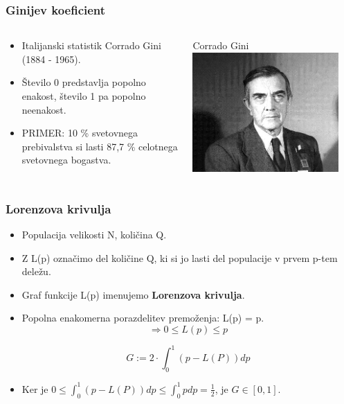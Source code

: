 \documentclass[10pt]{beamer}
\begin{document}
\begin{frame}
\frametitle{Ginijev koeficient}

\begin{columns}[T]
    \begin{column}{.5\textwidth}
     \begin{block}{}
\begin{itemize}
\item Italijanski statistik Corrado Gini (1884 - 1965).
\item Število 0 predstavlja popolno enakost, število 1 pa popolno neenakost. 
\item PRIMER: 10 \% svetovnega prebivalstva si lasti 87,7 \% celotnega svetovnega bogastva.
\end{itemize}
    \end{block}{}
    \end{column}
    \begin{column}{.5\textwidth}
    \begin{block}{Corrado Gini}
    \includegraphics[width=0.9\textwidth]{./slike/corrado-gini.jpg}
    \end{block}{}
    \end{column}
  \end{columns}
\end{frame}

\begin{frame}
\frametitle{Lorenzova krivulja}
\begin{itemize}
\item Populacija velikosti N, količina Q. 
\item Z L(p) označimo del količine Q, ki si jo lasti del populacije v prvem p-tem deležu.
\item Graf funkcije L(p) imenujemo \textbf{Lorenzova krivulja}.
\item Popolna enakomerna porazdelitev premoženja: L(p) = p.
$$\Rightarrow 0 \leq L(p) \leq p$$
\begin{tcolorbox}[colback=black!5,colframe=red!40!black,title=Ginijev koeficient]
$$G := 2 \cdot \int_{0}^{1} (p - L(P)) dp$$
\end{tcolorbox}
\item Ker je  $0 \leq \int_{0}^{1} (p - L(P)) dp \leq \int_{0}^{1} p dp = \frac{1}{2}$, je $G \in [0, 1].$
\end{itemize}
\end{frame}
\end{document}
